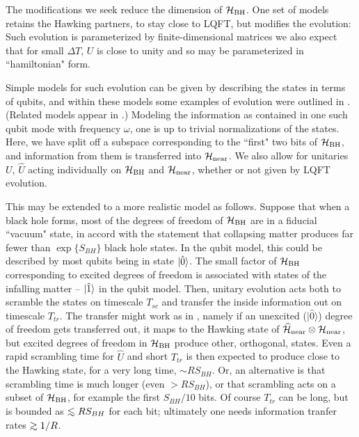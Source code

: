 
The modifications we seek reduce the dimension of ${{\cal H}_{\rm BH}}$.  One set of models retains the Hawking partners, to stay close to LQFT, but modifies the evolution:
%
\eqn{}
%
Such evolution is parameterized by finite-dimensional matrices
%
\eqn{}
%
we also expect that for small $\Delta T$, $U$ is close to unity and so may be parameterized in ``hamiltonian" form.

Simple models for such evolution can be given by describing the states in terms of qubits, and within these models some examples of evolution were outlined in \ModelsU.  (Related models appear in .)  Modeling the information as contained in one such qubit mode with frequency $\omega$, one is
%
\eqn{} 
%
up to trivial normalizations of the states. Here, we have split off a subspace corresponding to the ``first" two bits of ${{\cal H}_{\rm BH}}$, and information from them is transferred into ${{\cal H}_{\rm near}}$.  We also allow for unitaries $U$, ${\hat U}$ acting individually on ${{\cal H}_{\rm BH}}$ and ${{\cal H}_{\rm near}}$, whether or not given by LQFT evolution. 

This may be extended to a more realistic model as follows.  Suppose that when a black hole forms, most of the degrees of freedom of ${{\cal H}_{\rm BH}}$ are in a fiducial ``vacuum" state, in accord with the statement that collapsing matter produces far fewer than $\exp\{S_{BH}\}$ black hole states.  In the qubit model, this could be described by most qubits being in state $|{\hat 0}\rangle$.  The small factor of ${{\cal H}_{\rm BH}}$ corresponding to excited degrees of freedom is associated with states of the infalling matter -- $|{\hat 1}\rangle$ in the qubit model.  Then, unitary evolution acts both to scramble the states on  timescale $T_{sc}$ and transfer the inside information out on  timescale $T_{tr}$.  The transfer might work as in \evoltwo, namely if an unexcited ($|{\hat 0}\rangle$) degree of freedom gets transferred out, it maps to the Hawking state of ${\widehat{\cal H}}_{\rm near}\otimes {{\cal H}_{\rm near}}$, but excited degrees of freedom in ${{\cal H}_{\rm BH}}$ produce other, orthogonal, states.  Even a rapid scrambling time for $\hat U$ and short $T_{tr}$ is then expected to produce close to the Hawking state, for a very long time, $\sim R S_{BH}$.  Or, an alternative is that scrambling time is much longer (even $> RS_{BH}$), or that scrambling acts on a subset of ${{\cal H}_{\rm BH}}$, for example the first $S_{BH}/10$ bits.  Of course $T_{tr}$ can be long, but is bounded as $\roughly< R S_{BH}$ for each bit; ultimately one needs information tranfer rates $\roughly> 1/R$.  

